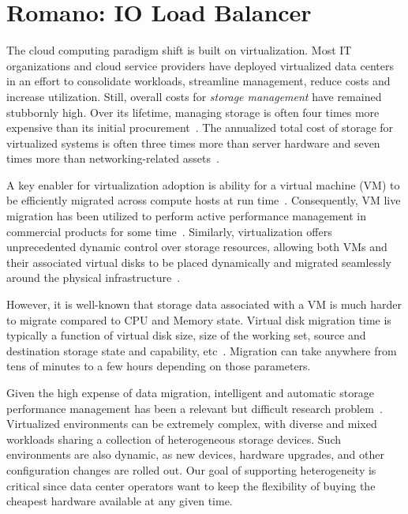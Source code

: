 \chapter{Romano: IO Load Balancer}
\label{ROMANO}

The cloud computing paradigm shift is built on virtualization.
Most IT organizations and cloud service providers have deployed virtualized data centers in an effort to consolidate workloads, streamline management, reduce costs and increase utilization.
Still, overall costs for {\em storage management} have remained stubbornly high.
Over its lifetime, managing storage is often four times more expensive than its initial procurement~\cite{merrill:2009}.
The annualized total cost of storage for virtualized systems is often three times more than server hardware and seven times more than networking-related assets~\cite{simpson:2010}.

A key enabler for virtualization adoption is ability for a virtual machine (VM) to be efficiently migrated across compute hosts at run time~\cite{clark:2005, wood:2007, nelson:2005}.
Consequently, VM live migration has been utilized to perform active performance management in commercial products for some time~\cite{vmware:2006}. 
Similarly, virtualization offers unprecedented dynamic control over storage resources, allowing both VMs and their associated virtual disks to be placed dynamically and migrated seamlessly around the physical infrastructure~\cite{mashtizadeh:2011}.

However, it is well-known that storage data associated with a VM is much harder to migrate compared to CPU and Memory state. 
Virtual disk migration time is typically a function of virtual disk size, size of the working set, source and destination storage state and capability, etc~\cite{mashtizadeh:2011}. 
Migration can take anywhere from tens of minutes to a few hours depending on those parameters.

Given the high expense of data migration, intelligent and automatic storage performance management has been a relevant but difficult research problem~\cite{gulati:2010, gulati:2011}. 
Virtualized environments can be extremely complex, with diverse and mixed workloads sharing a collection of heterogeneous storage devices. 
Such environments are also dynamic, as new devices, hardware upgrades, and other configuration changes are rolled out. 
Our goal of supporting heterogeneity is critical since data center operators want to keep the flexibility of buying the cheapest hardware available at any given time.

